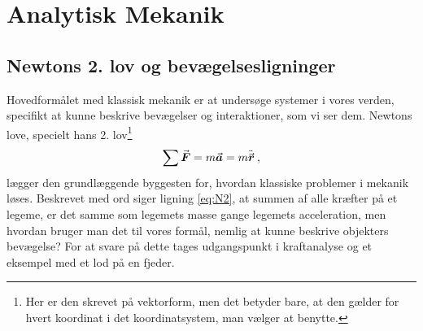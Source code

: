 \chapter{Analytisk Mekanik}\label{cha:Mekanik}
\section{Newtons 2. lov og bevægelsesligninger} \label{sec:fjeder}
Hovedformålet med klassisk mekanik er at undersøge systemer i vores verden, specifikt at kunne beskrive bevægelser og interaktioner, som vi ser dem.
Newtons love, specielt hans 2. lov\footnote{Her er den skrevet på vektorform, men det betyder bare, at den gælder for hvert koordinat i det koordinatsystem, man vælger at benytte.}
\begin{align} \label{eq:N2}
	\sum{\vec{\boldsymbol{F}}} = m{\vec{\boldsymbol{a}}} = m\ddot{{\vec{\boldsymbol{r}}}} \: ,
\end{align}
lægger den grundlæggende byggesten for, hvordan klassiske problemer i mekanik løses. Beskrevet med ord siger ligning \eqref{eq:N2}, at summen af alle kræfter på et legeme, er det samme som legemets masse gange legemets acceleration, men hvordan bruger man det til vores formål, nemlig at kunne beskrive objekters bevægelse? For at svare på dette tages udgangspunkt i kraftanalyse og et eksempel med et lod på en fjeder. \\

